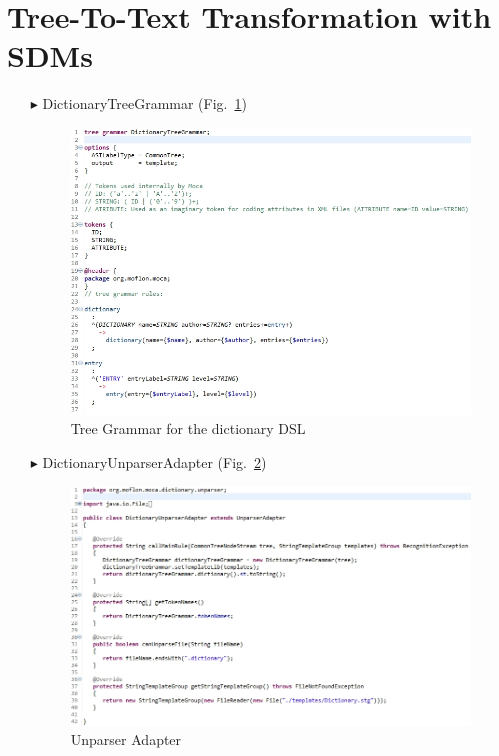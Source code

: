 \section{Tree-To-Text Transformation with SDMs}
\begin{enumerate}
\item[$\blacktriangleright$] DictionaryTreeGrammar
  (Fig.~\ref{fig:moca-DictionaryTreeGrammar})    
\begin{figure}[!htbp]
\begin{center}
 \includegraphics[width=\textwidth]{pics/moca/4ModelToMocaTree/DictionaryTreeGrammar}
  \caption{Tree Grammar for the dictionary DSL} 
  \label{fig:moca-DictionaryTreeGrammar}
\end{center}
\end{figure} 

\item[$\blacktriangleright$] DictionaryUnparserAdapter
  (Fig.~\ref{fig:moca-DictionaryUnparserAdapter})    
\begin{figure}[!htbp]
\begin{center}
 \includegraphics[width=\textwidth]{pics/moca/4ModelToMocaTree/DictionaryUnparserAdapter}
  \caption{Unparser Adapter} 
  \label{fig:moca-DictionaryUnparserAdapter}
\end{center}
\end{figure} 


\end{enumerate}
